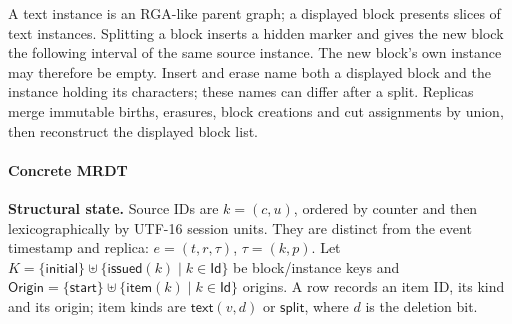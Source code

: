 














A text instance is an RGA-like parent graph; a displayed block presents
slices of text instances. Splitting a block inserts a hidden marker and gives the new
block the following interval of the same source instance. The new block's own
instance may therefore be empty. Insert and erase name both a displayed block
and the instance holding its characters; these names can differ after a split.
Replicas merge immutable births, erasures, block creations and cut assignments
by union, then reconstruct the displayed block list.

\paragraph{Concrete MRDT}
\textbf{Structural state.} Source IDs are $k=(c,u)$, ordered by counter and then lexicographically by UTF-16 session units. They are distinct from the event timestamp and replica: $e=(t,r,\tau)$, $\tau=(k,p)$. Let $K=\{\mathsf{initial}\}\uplus\{\mathsf{issued}(k)\mid k\in\mathsf{Id}\}$ be block/instance keys and $\mathsf{Origin}=\{\mathsf{start}\}\uplus\{\mathsf{item}(k)\mid k\in\mathsf{Id}\}$ origins. A row records an item ID, its kind and its origin; item kinds are $\mathsf{text}(v,d)$ or $\mathsf{split}$, where $d$ is the deletion bit.

